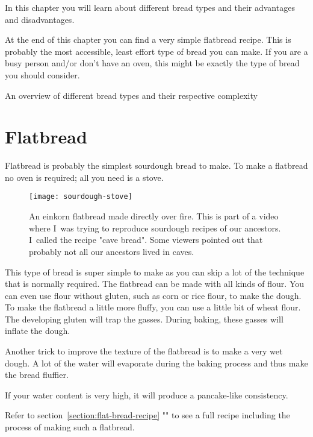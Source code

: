 In this chapter you will learn about different bread types
and their advantages and disadvantages.

At the end of this chapter
you can find a very simple flatbread recipe. This is probably
the most accessible, least effort type of bread you can make.
If you are a busy person and/or don't have an oven, this might
be exactly the type of bread you should consider.

\begin{table}[!htb]
    \begin{center}
        
        \caption{An overview of different bread types and their respective complexity}
    \end{center}
  \label{tab:bread-types-comparison}
\end{table}

\section{Flatbread}

Flatbread is probably the simplest sourdough bread to make.
To make a flatbread no oven is required; all you need is a stove.

\begin{figure}[!htb]
  \texttt{[image: sourdough-stove]}
  \caption{An einkorn flatbread made directly over fire. This
  is part of a video where I~was trying to reproduce sourdough
  recipes of our ancestors. I~called the recipe "cave bread". Some viewers
  pointed out that probably not all our ancestors lived in caves.
  }
\end{figure}

This type of bread is super simple to make as you can skip
a lot of the technique that is normally required. The flatbread
can be made with all kinds of flour. You can even use
flour without gluten, such as corn or rice flour, to make the
dough. To make the flatbread a little more fluffy, you
can use a little bit of wheat flour. The developing gluten
will trap the gasses. During baking, these gasses will
inflate the dough.

Another trick to improve the texture of the flatbread is to
make a very wet dough. A lot of the water will evaporate
during the baking process and thus make the bread fluffier.

If your water content is very high, it will produce a
pancake-like consistency.

Refer to section~\ref{section:flat-bread-recipe} ""
to see a full recipe including the process of making such a flatbread.


